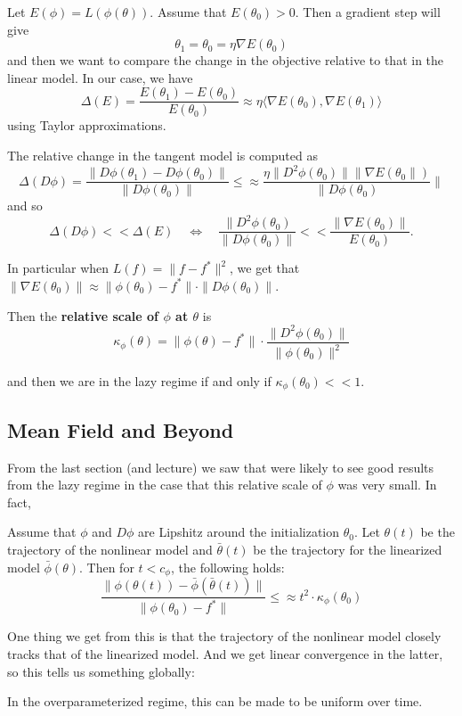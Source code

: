 \documentclass[12pt]{article}
\begin{document}
Let $E(\phi)=L(\phi(\theta))$. Assume that $E(\theta_0)>0$. Then a gradient step will give 
\[\theta_1=\theta_0=\eta\nabla E(\theta_0)\]
and then we want to compare the change in the objective relative to that in the linear model. In our case, we have 
\[\Delta(E)=\frac{E(\theta_1)-E(\theta_0)}{E(\theta_0)}\approx \eta\langle\nabla E(\theta_0),\nabla E(\theta_1)\rangle\]
using Taylor approximations.

The relative change in the tangent model is computed as
\[\Delta (D\phi)=\frac{\|D\phi(\theta_1)-D\phi(\theta_0)\|}{\|D\phi(\theta_0)\|}\le\approx \frac{\eta\|D^2\phi(\theta_0)\|\|\nabla E(\theta_0\|)}{\|D\phi(\theta_0)}\|\]
and so 
\[\Delta(D\phi)<<\Delta(E)\quad\Leftrightarrow\quad \frac{\|D^2\phi(\theta_0)}{\|D\phi(\theta_0)\|} << \frac{\|\nabla E(\theta_0)\|}{E(\theta_0)}.\]

In particular when $L(f)=\|f-f^\ast\|^2$, we get that $\|\nabla E(\theta_0)\|\approx \|\phi(\theta_0)-f^\ast\|\cdot\|D\phi(\theta_0)\|$.

\begin{defn}
	Then the \textbf{relative scale of $\phi$ at $\theta$} is 
	\[\kappa_\phi(\theta)=\|\phi(\theta)-f^\ast\|\cdot\frac{\|D^2\phi(\theta_0)\|}{\|\phi(\theta_0)\|^2}\]
\end{defn}
and then we are in the lazy regime if and only if $\kappa_\phi(\theta_0)<< 1.$

\subsection{Mean Field and Beyond}
From the last section (and lecture) we saw that were likely to see good results from the lazy regime in the case that this relative scale of $\phi$ was very small. In fact,
\begin{thm}
	Assume that $\phi$ and $D\phi$ are Lipshitz around the initialization $\theta_0$. Let $\theta(t)$ be the trajectory of the nonlinear model and $\bar\theta(t)$ be the trajectory for the linearized model $\bar\phi(\theta)$.
	Then for $t<c_\phi$, the following holds:
	\[\frac{\|\phi(\theta(t))-\bar\phi(\bar\theta(t))\|}{\|\phi(\theta_0)-f^\ast\|}\le\approx t^2\cdot \kappa_\phi(\theta_0)\]
\end{thm}
\begin{rmk}
	One thing we get from this is that the trajectory of the nonlinear model closely tracks that of the linearized model. And we get linear convergence in the latter, so this tells us something globally:
\end{rmk}
\begin{thm}[Ibid 2.4]
	In the overparameterized regime, this can be made to be uniform over time.
\end{thm}
\end{document}
